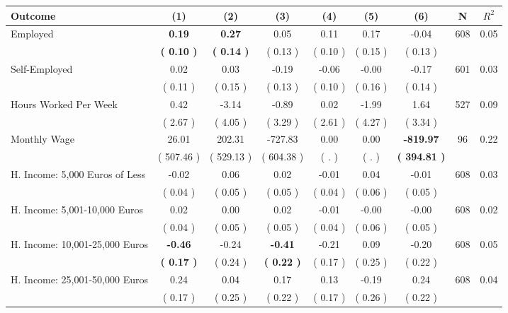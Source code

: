 \begin{tabular}{lcccccccc}
\toprule
 \textbf{Outcome} & \textbf{(1)} & \textbf{(2)} & \textbf{(3)} & \textbf{(4)} & \textbf{(5)} & \textbf{(6)} & \textbf{N} & \textbf{$ R^2$} \\
\midrule
Employed & \textbf{     0.19} & \textbf{     0.27} &      0.05 &      0.11 &      0.17 &     -0.04 & 608 &       0.05 \\ 
 & \textbf{(     0.10 )} & \textbf{(     0.14 )} & (     0.13 ) & (     0.10 ) & (     0.15 ) & (     0.13 ) & \\
Self-Employed &      0.02 &      0.03 &     -0.19 &     -0.06 &     -0.00 &     -0.17 & 601 &       0.03 \\ 
 & (     0.11 ) & (     0.15 ) & (     0.13 ) & (     0.10 ) & (     0.16 ) & (     0.14 ) & \\
Hours Worked Per Week &      0.42 &     -3.14 &     -0.89 &      0.02 &     -1.99 &      1.64 & 527 &       0.09 \\ 
 & (     2.67 ) & (     4.05 ) & (     3.29 ) & (     2.61 ) & (     4.27 ) & (     3.34 ) & \\
Monthly Wage &     26.01 &    202.31 &   -727.83 &      0.00 &      0.00 & \textbf{  -819.97} & 96 &       0.22 \\ 
 & (   507.46 ) & (   529.13 ) & (   604.38 ) & (        . ) & (        . ) & \textbf{(   394.81 )} & \\
H. Income: 5,000 Euros of Less &     -0.02 &      0.06 &      0.02 &     -0.01 &      0.04 &     -0.01 & 608 &       0.03 \\ 
 & (     0.04 ) & (     0.05 ) & (     0.05 ) & (     0.04 ) & (     0.06 ) & (     0.05 ) & \\
H. Income: 5,001-10,000 Euros &      0.02 &      0.00 &      0.02 &     -0.01 &     -0.00 &     -0.00 & 608 &       0.02 \\ 
 & (     0.04 ) & (     0.05 ) & (     0.05 ) & (     0.04 ) & (     0.06 ) & (     0.05 ) & \\
H. Income: 10,001-25,000 Euros & \textbf{    -0.46} &     -0.24 & \textbf{    -0.41} &     -0.21 &      0.09 &     -0.20 & 608 &       0.05 \\ 
 & \textbf{(     0.17 )} & (     0.24 ) & \textbf{(     0.22 )} & (     0.17 ) & (     0.25 ) & (     0.22 ) & \\
H. Income: 25,001-50,000 Euros &      0.24 &      0.04 &      0.17 &      0.13 &     -0.19 &      0.24 & 608 &       0.04 \\ 
 & (     0.17 ) & (     0.25 ) & (     0.22 ) & (     0.17 ) & (     0.26 ) & (     0.22 ) & \\

\end{tabular}
